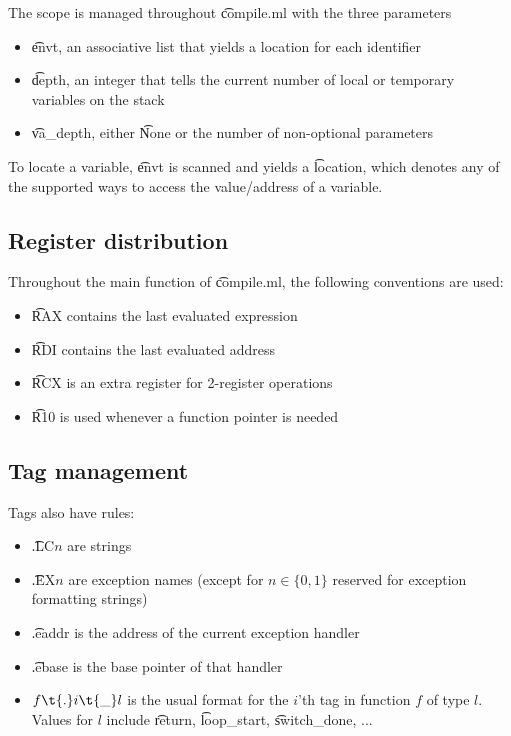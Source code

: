 The scope is managed throughout \t{compile.ml} with the three parameters
\begin{itemize}
    \item \t{envt}, an associative list that yields a location for each identifier
    \item \t{depth}, an integer that tells the current number of local or temporary variables on the stack
    \item \t{va\_depth}, either \t{None} or the number of non-optional parameters
\end{itemize}

To locate a variable, \t{envt} is scanned and yields a \t{location}, which denotes any of the supported ways to access the value/address of a variable.

\subsection{Register distribution}

Throughout the main function of \t{compile.ml}, the following conventions are used:
\begin{itemize}
    \item \t{RAX} contains the last evaluated expression
    \item \t{RDI} contains the last evaluated address
    \item \t{RCX} is an extra register for 2-register operations
    \item \t{R10} is used whenever a function pointer is needed
\end{itemize}

\subsection{Tag management}
Tags also have rules:
\begin{itemize}
    \item \t{.LC}\(n\) are strings
    \item \t{.EX}\(n\) are exception names (except for \(n\in \{ 0, 1 \}\) reserved for exception formatting strings)
    \item \t{.eaddr} is the address of the current exception handler
    \item \t{.ebase} is the base pointer of that handler
    \item \(f\t{.}i\t{\_}l\) is the usual format for the \(i\)'th tag in function \(f\) of type \(l\). Values for \(l\) include \t{return}, \t{loop\_start}, \t{switch\_done}, ...
\end{itemize}

